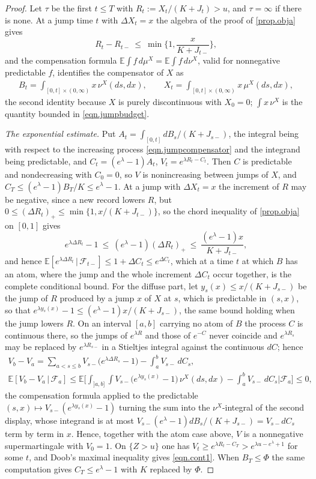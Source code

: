 \documentclass[12pt,oneside,reqno,fleqn]{amsart}
\numberwithin{equation}{section}
\theoremstyle{remark}
\newcommand\cff{{\mathcal F}}
\newcommand\mE{{\mathbb E}}
\newcommand\E{\mE}
\newcommand{\1}{{\mathbf 1}}
\renewcommand{\le}{\leq}
\renewcommand{\ge}{\geq}
\begin{document}
	\begin{proof}
		Let $\tau$ be the first $t\le T$ with $R_t:=X_t/(K+J_t)>u$, and $\tau=\infty$ if there is none. At a jump time $t$ with $\Delta X_t=x$ the algebra of the proof of \cref{prop.obja} gives
		\[
			R_t-R_{t-}\ \le\ \min\Big\{1,\frac{x}{K+J_{t-}}\Big\},
		\]
		and the compensation formula $\E\int f\,d\mu^X=\E\int f\,d\nu^X$, valid for nonnegative predictable $f$, identifies the compensator of $X$ as
		\begin{align}\label{eqn.jumpcompensator}
			B_t=\int_{[0,t]\times(0,\infty)}x\,\nu^X(ds,dx),\qquad
			X_t=\int_{[0,t]\times(0,\infty)}x\,\mu^X(ds,dx),
		\end{align}
		the second identity because $X$ is purely discontinuous with $X_0=0$; $\int x\,\nu^X$ is the quantity bounded in \eqref{eqn.jumpbudget}.

		\emph{The exponential estimate.} Put $A_t=\int_{[0,t]}dB_s/(K+J_{s-})$, the integral being with respect to the increasing process \eqref{eqn.jumpcompensator} and the integrand being predictable, and $C_t=(e^\lambda-1)A_t$, $V_t=e^{\lambda R_t-C_t}$. Then $C$ is predictable and nondecreasing with $C_0=0$, so $V$ is nonincreasing between jumps of $X$, and $C_T\le(e^\lambda-1)B_T/K\le e^\lambda-1$. At a jump with $\Delta X_t=x$ the increment of $R$ may be negative, since a new record lowers $R$, but $0\le(\Delta R_t)_+\le\min\{1,x/(K+J_{t-})\}$, so the chord inequality of \cref{prop.obja} on $[0,1]$ gives \[e^{\lambda\Delta R_t}-1\ \le\ (e^\lambda-1)(\Delta R_t)_+\ \le\ \frac{(e^\lambda-1)x}{K+J_{t-}},\] and hence $\E[e^{\lambda\Delta R_t}\,|\,\cff_{t-}]\le1+\Delta C_t\le e^{\Delta C_t}$, which at a time $t$ at which $B$ has an atom, where the jump and the whole increment $\Delta C_t$ occur together, is the complete conditional bound. For the diffuse part, let $y_s(x)\le x/(K+J_{s-})$ be the jump of $R$ produced by a jump $x$ of $X$ at $s$, which is predictable in $(s,x)$, so that $e^{\lambda y_s(x)}-1\le(e^\lambda-1)x/(K+J_{s-})$, the same bound holding when the jump lowers $R$. On an interval $[a,b]$ carrying no atom of $B$ the process $C$ is continuous there, so the jumps of $e^{\lambda R}$ and those of $e^{-C}$ never coincide and $e^{\lambda R_s}$ may be replaced by $e^{\lambda R_{s-}}$ in a Stieltjes integral against the continuous $dC$; hence \begin{gather*}V_b-V_a=\sum_{a<s\le b}V_{s-}\big(e^{\lambda\Delta R_s}-1\big)-\int_a^bV_{s-}\,dC_s,\\ \E[V_b-V_a\,|\,\cff_a]\le\E\Big[\int_{]a,b]}\int V_{s-}\big(e^{\lambda y_s(x)}-1\big)\,\nu^X(ds,dx)-\int_a^bV_{s-}\,dC_s\Big|\cff_a\Big]\le0,\end{gather*} the compensation formula applied to the predictable $(s,x)\mapsto V_{s-}(e^{\lambda y_s(x)}-1)$ turning the sum into the $\nu^X$-integral of the second display, whose integrand is at most $V_{s-}(e^\lambda-1)dB_s/(K+J_{s-})=V_{s-}dC_s$ term by term in $x$. Hence, together with the atom case above, $V$ is a nonnegative supermartingale with $V_0=1$. On $\{Z>u\}$ one has $V_t\ge e^{\lambda R_t-C_T}>e^{\lambda u-e^\lambda+1}$ for some $t$, and Doob's maximal inequality gives \eqref{eqn.cont1}. When $B_T\le\Phi$ the same computation gives $C_T\le e^\lambda-1$ with $K$ replaced by $\Phi$.


\end{proof}
\end{document}
